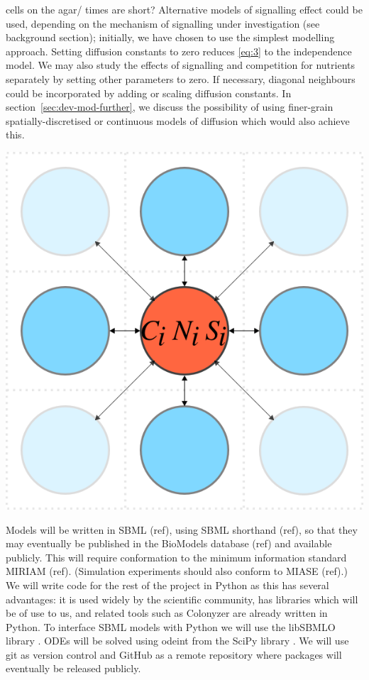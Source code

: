 cells on the agar/ times are short? Alternative models of signalling
effect could be used, depending on the mechanism of signalling under
investigation (see background section); initially, we have chosen to
use the simplest modelling approach. Setting diffusion constants to
zero reduces \ref{eq:3} to the independence model. We may also study
the effects of signalling and competition for nutrients separately by
setting other parameters to zero. If necessary, diagonal neighbours
could be incorporated by adding or scaling diffusion constants. In
section~\ref{sec:dev-mod-further}, we discuss the possibility of using
finer-grain spatially-discretised or continuous models of diffusion
which would also achieve this.

\begin{Figure}
  \centering
  \includegraphics[width=\linewidth]{square_array}
  \label{fig:simple_model}
\end{Figure}

Models will be written in SBML (ref), using SBML shorthand (ref), so
that they may eventually be published in the BioModels database (ref)
and available publicly. This will require conformation to the minimum
information standard MIRIAM (ref). (Simulation experiments should also
conform to MIASE (ref).) We will write code for the rest of the
project in Python as this has several advantages: it is used widely by
the scientific community, has libraries which will be of use to us,
and related tools such as Colonyzer \citet{Lawless2010} are already
written in Python. To interface SBML models with Python we will use
the libSBMLO library \citep{Bornstein2008}. ODEs will be solved using
odeint from the SciPy library \citep{SciPy}. We will use git as
version control and GitHub as a remote repository where packages will
eventually be released publicly.


